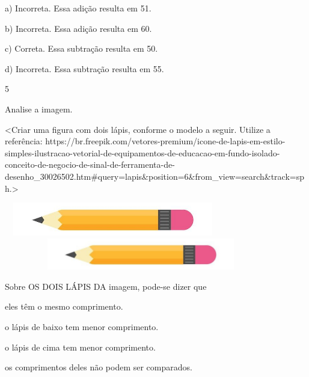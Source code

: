{{{{{{a) Incorreta. Essa adição resulta em 51.

b) Incorreta. Essa adição resulta em 60.

c) Correta. Essa subtração resulta em 50.

d) Incorreta. Essa subtração resulta em 55.

\num{5}

Analise a imagem.

\textless{}Criar uma figura com dois lápis, conforme o modelo a seguir.
Utilize a referência:
https://br.freepik.com/vetores-premium/icone-de-lapis-em-estilo-simples-ilustracao-vetorial-de-equipamentos-de-educacao-em-fundo-isolado-conceito-de-negocio-de-sinal-de-ferramenta-de-desenho\_30026502.htm\#query=lapis\&position=6\&from\_view=search\&track=sph.\textgreater{}

\includegraphics[width=3.74118in,height=0.57310in]{media/image29.jpg}\includegraphics[width=4.71287in,height=0.53673in]{media/image29.jpg}

Sobre OS DOIS LÁPIS DA imagem, pode-se dizer que

\begin{escolha}
\item eles têm o mesmo comprimento.

\item o lápis de baixo tem menor comprimento.

\item o lápis de cima tem menor comprimento.

\item os comprimentos deles não podem ser comparados.
\end{escolha}

}}}}}}

